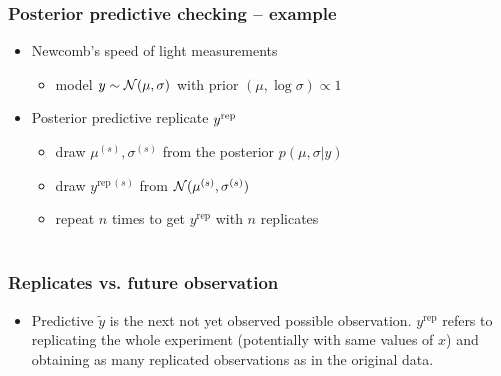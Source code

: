 \documentclass[10pt,handout]{beamer}
\begin{document}
\begin{frame}[fragile]

\frametitle{Posterior predictive checking -- example}

  \begin{itemize}
  \item<1-> Newcomb's speed of light measurements
    \begin{itemize}
    \item model $y\sim\mathcal{N}(\mu,\sigma)$ with prior $(\mu,\log\sigma)\propto 1$
    \end{itemize}
  \item<2-> Posterior predictive replicate $y^{\rm rep}$
    \begin{itemize}
    \item<3-> draw $\mu^{(s)},\sigma^{(s)}$ from the posterior $p(\mu,\sigma|y)$
    \item<4-> draw $y^{\mathrm{rep}\,(s)}$ from $\mathcal{N}(\mu^{(s)},\sigma^{(s)})$
    \item<5-> repeat $n$ times to get $y^{\mathrm{rep}}$ with $n$ replicates\\~\\
      \end{itemize}
    \end{itemize}

\end{frame}

\begin{frame}

\frametitle{Replicates vs. future observation}

  \begin{itemize}
  \item Predictive $\tilde{y}$ is the next not yet observed possible
    observation. $y^{\mathrm{rep}}$ refers to replicating the whole
    experiment (potentially with same values of $x$) and obtaining as
    many replicated observations as in the original data.
  \end{itemize}

\end{frame}
\end{document}
